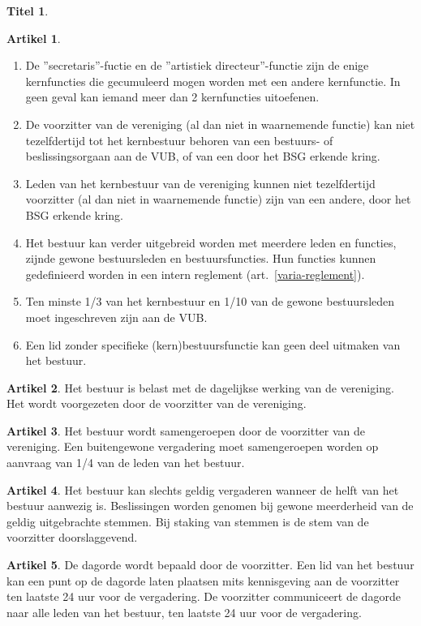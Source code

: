 \documentclass[a4paper,10pt]{article}
\theoremstyle{definition}
\newtheorem{titel}{\newline\Large Titel}
\newtheorem{artikel}{\large Artikel}
\newcommand{\ttextcr}{\hfill\newline}
\begin{document}
\begin{titel}
\begin{artikel}
\begin{enumerate}
      \item
        De ''secretaris''-fuctie en de ''artistiek directeur''-functie zijn de enige kernfuncties die gecumuleerd mogen worden met een andere kernfunctie.
        In geen geval kan iemand meer dan 2 kernfuncties uitoefenen.
      \item De voorzitter van de vereniging (al dan niet in waarnemende functie) kan niet tezelfdertijd tot het kernbestuur behoren van een bestuurs- of beslissingsorgaan aan de VUB, of van een door het BSG erkende kring.
      \item Leden van het kernbestuur van de vereniging kunnen niet tezelfdertijd voorzitter (al dan niet in waarnemende functie) zijn van een andere, door het BSG erkende kring. %
      \item Het bestuur kan verder uitgebreid worden met meerdere leden en functies, zijnde gewone bestuursleden en bestuursfuncties.
        Hun functies kunnen gedefinieerd worden in een intern reglement (art.~\ref{varia-reglement}).
      \item Ten minste 1/3 van het kernbestuur en 1/10 van de gewone bestuursleden moet ingeschreven zijn aan de VUB.
      \item Een lid zonder specifieke (kern)bestuursfunctie kan geen deel uitmaken van het bestuur.
    \end{enumerate}
  \end{artikel}

  \begin{artikel}\ttextcr
    Het bestuur is belast met de dagelijkse werking van de vereniging.
    Het wordt voorgezeten door de voorzitter van de vereniging.
  \end{artikel}

  \begin{artikel}\ttextcr
    Het bestuur wordt samengeroepen door de voorzitter van de vereniging.
    Een buitengewone vergadering moet samengeroepen worden op aanvraag van 1/4 van de leden van het bestuur.
  \end{artikel}

  \begin{artikel}\ttextcr
    Het bestuur kan slechts geldig vergaderen wanneer de helft van het bestuur aanwezig is.
    Beslissingen worden genomen bij gewone meerderheid van de geldig uitgebrachte stemmen.
    Bij staking van stemmen is de stem van de voorzitter doorslaggevend.
  \end{artikel}

  \begin{artikel}\ttextcr
    De dagorde wordt bepaald door de voorzitter.
    Een lid van het bestuur kan een punt op de dagorde laten plaatsen mits kennisgeving aan de voorzitter ten laatste 24 uur voor de vergadering.
    De voorzitter communiceert de dagorde naar alle leden van het bestuur, ten laatste 24 uur voor de vergadering.
  \end{artikel}

\end{titel}
\end{document}
